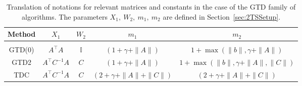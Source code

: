 \documentclass[usenames,dvipsnames,final,12pt]{colt2018} %
\newcommand{\Xt}{X_1}
\newcommand{\mt}{m_1}
\newcommand{\Ww}{W_2}
\newcommand{\mw}{m_2}
\newcommand{\Id}{\mathbb{I}}
\begin{document}
\begin{table*}[t]
	{%
\begin{center}
\begin{tabular}{|c|c|c|c|c|}
\hline
Method & $\Xt$ & $\Ww$ & $\mt$ & $\mw$ \\
\hline
& & & & \\ [-2ex]
GTD(0) & $A^\top A$ & $\Id$ & $(1+\gamma+\|A\|)$ & $ 1 + \max(\|b\|,\gamma+\|A\|)$ \\ [0.5ex]
GTD2 & $A^\top C^{-1} A$ & $C$ & $ (1+\gamma+\|A\|)$ & $ 1 + \max(\|b\|,\gamma+\|A\|,\|C\|)$ \\ [0.5ex]
TDC & $A^\top C^{-1} A$ & $C$ &  $ (2+\gamma+\|A\|+\|C\|)$ & $ (2+\gamma+\|A\|+\|C\|)$ \\
\hline
\end{tabular}
\end{center}
\caption{\label{table:RL algorithms} Translation of notations for relevant matrices and constants in the case of the GTD family of algorithms. The parameters $\Xt,~\Ww,~\mt,~\mw$ are defined in Section~\ref{sec:2TSSetup}.}
}
\end{table*}
\end{document}
